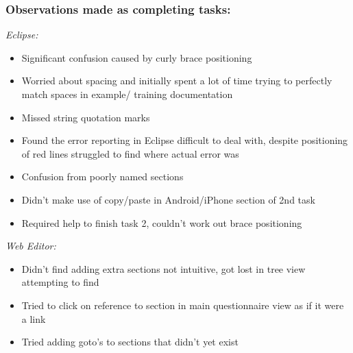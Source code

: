 \documentclass{report}
\begin{document}
\subsubsection*{Observations made as completing tasks:}

\emph{Eclipse:}
\begin{itemize}
\item Significant confusion caused by curly brace positioning
\item Worried about spacing and initially spent a lot of time trying to perfectly match spaces in example/ training documentation
\item Missed string quotation marks
\item Found the error reporting in Eclipse difficult to deal with, despite positioning of red lines struggled to find where actual error was
\item Confusion from poorly named sections
\item Didn't make use of copy/paste in Android/iPhone section of 2nd task
\item Required help to finish task 2, couldn't work out brace positioning
\end{itemize}
\emph{Web Editor:}
\begin{itemize}
\item Didn't find adding extra sections not intuitive, got lost in tree view attempting to find
\item Tried to click on reference to section in main questionnaire view as if it were a link
\item Tried adding goto's to sections that didn't yet exist
\end{itemize}
\end{document}
